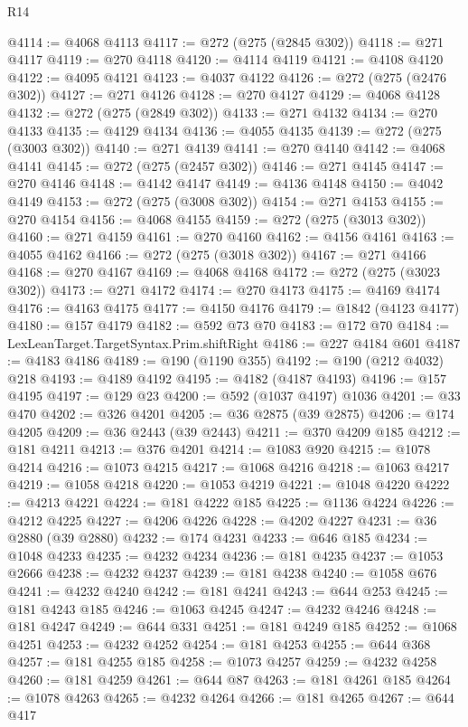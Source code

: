 \begin{lexlean}{R14}
\begin{coremodule}
@4114 := @4068 @4113
@4117 := @272 (@275 (@2845 @302))
@4118 := @271 @4117
@4119 := @270 @4118
@4120 := @4114 @4119
@4121 := @4108 @4120
@4122 := @4095 @4121
@4123 := @4037 @4122
@4126 := @272 (@275 (@2476 @302))
@4127 := @271 @4126
@4128 := @270 @4127
@4129 := @4068 @4128
@4132 := @272 (@275 (@2849 @302))
@4133 := @271 @4132
@4134 := @270 @4133
@4135 := @4129 @4134
@4136 := @4055 @4135
@4139 := @272 (@275 (@3003 @302))
@4140 := @271 @4139
@4141 := @270 @4140
@4142 := @4068 @4141
@4145 := @272 (@275 (@2457 @302))
@4146 := @271 @4145
@4147 := @270 @4146
@4148 := @4142 @4147
@4149 := @4136 @4148
@4150 := @4042 @4149
@4153 := @272 (@275 (@3008 @302))
@4154 := @271 @4153
@4155 := @270 @4154
@4156 := @4068 @4155
@4159 := @272 (@275 (@3013 @302))
@4160 := @271 @4159
@4161 := @270 @4160
@4162 := @4156 @4161
@4163 := @4055 @4162
@4166 := @272 (@275 (@3018 @302))
@4167 := @271 @4166
@4168 := @270 @4167
@4169 := @4068 @4168
@4172 := @272 (@275 (@3023 @302))
@4173 := @271 @4172
@4174 := @270 @4173
@4175 := @4169 @4174
@4176 := @4163 @4175
@4177 := @4150 @4176
@4179 := @1842 (@4123 @4177)
@4180 := @157 @4179
@4182 := @592 @73 @70
@4183 := @172 @70
@4184 := LexLeanTarget.TargetSyntax.Prim.shiftRight
@4186 := @227 @4184 @601
@4187 := @4183 @4186
@4189 := @190 (@1190 @355)
@4192 := @190 (@212 @4032) @218
@4193 := @4189 @4192
@4195 := @4182 (@4187 @4193)
@4196 := @157 @4195
@4197 := @129 @23
@4200 := @592 (@1037 @4197) @1036
@4201 := @33 @470
@4202 := @326 @4201
@4205 := @36 @2875 (@39 @2875)
@4206 := @174 @4205
@4209 := @36 @2443 (@39 @2443)
@4211 := @370 @4209 @185
@4212 := @181 @4211
@4213 := @376 @4201
@4214 := @1083 @920
@4215 := @1078 @4214
@4216 := @1073 @4215
@4217 := @1068 @4216
@4218 := @1063 @4217
@4219 := @1058 @4218
@4220 := @1053 @4219
@4221 := @1048 @4220
@4222 := @4213 @4221
@4224 := @181 @4222 @185
@4225 := @1136 @4224
@4226 := @4212 @4225
@4227 := @4206 @4226
@4228 := @4202 @4227
@4231 := @36 @2880 (@39 @2880)
@4232 := @174 @4231
@4233 := @646 @185
@4234 := @1048 @4233
@4235 := @4232 @4234
@4236 := @181 @4235
@4237 := @1053 @2666
@4238 := @4232 @4237
@4239 := @181 @4238
@4240 := @1058 @676
@4241 := @4232 @4240
@4242 := @181 @4241
@4243 := @644 @253
@4245 := @181 @4243 @185
@4246 := @1063 @4245
@4247 := @4232 @4246
@4248 := @181 @4247
@4249 := @644 @331
@4251 := @181 @4249 @185
@4252 := @1068 @4251
@4253 := @4232 @4252
@4254 := @181 @4253
@4255 := @644 @368
@4257 := @181 @4255 @185
@4258 := @1073 @4257
@4259 := @4232 @4258
@4260 := @181 @4259
@4261 := @644 @87
@4263 := @181 @4261 @185
@4264 := @1078 @4263
@4265 := @4232 @4264
@4266 := @181 @4265
@4267 := @644 @417

\end{coremodule}
\end{lexlean}
